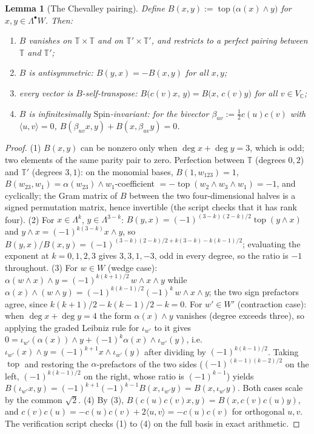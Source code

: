 \documentclass[11pt]{article}
\newtheorem{lemma}[theorem]{Lemma}
\theoremstyle{definition}
\newcommand{\C}{\mathbb{C}}
\newcommand{\T}{\mathbb{T}}
\newcommand{\ip}[2]{\langle #1, #2\rangle}
\begin{document}
\begin{lemma}[The Chevalley pairing]\label{lem:chevalley}
Define $B(x, y) := \operatorname{top}\bigl(\alpha(x) \wedge y\bigr)$ for $x, y \in \Lambda^\bullet W$. Then:
\begin{enumerate}
\item $B$ vanishes on $\T \times \T$ and on $\T' \times \T'$, and restricts to a perfect pairing between $\T$ and $\T'$;
\item $B$ is antisymmetric: $B(y,x) = -B(x,y)$ for all $x, y$;
\item every vector is $B$-self-transpose: $B\bigl(c(v)x,\, y\bigr) = B\bigl(x,\, c(v)y\bigr)$ for all $v \in V_\C$;
\item $B$ is infinitesimally $\mathrm{Spin}$-invariant: for the bivector $\beta_{uv} := \tfrac12 c(u)c(v)$ with $\ip{u}{v} = 0$, $B(\beta_{uv}x, y) + B(x, \beta_{uv}y) = 0$.
\end{enumerate}
\end{lemma}

\begin{proof}
(1) $B(x,y)$ can be nonzero only when $\deg x + \deg y = 3$, which is odd; two elements of the same parity pair to zero. Perfection between $\T$ (degrees $0,2$) and $\T'$ (degrees $3,1$): on the monomial bases, $B(1, w_{123}) = 1$, $B(w_{23}, w_1) = \alpha(w_{23})\wedge w_1$-coefficient $= -\operatorname{top}(w_2\wedge w_3\wedge w_1) = -1$, and cyclically; the Gram matrix of $B$ between the two four-dimensional halves is a signed permutation matrix, hence invertible (the script checks that it has rank four).
(2) For $x \in \Lambda^k$, $y \in \Lambda^{3-k}$: $B(y,x) = (-1)^{(3-k)(2-k)/2}\operatorname{top}(y \wedge x)$ and $y\wedge x = (-1)^{k(3-k)}x\wedge y$, so $B(y,x)/B(x,y) = (-1)^{(3-k)(2-k)/2 + k(3-k) - k(k-1)/2}$; evaluating the exponent at $k = 0,1,2,3$ gives $3, 3, 1, -3$, odd in every degree, so the ratio is $-1$ throughout.
(3) For $w \in W$ (wedge case): $\alpha(w \wedge x)\wedge y = (-1)^{k(k+1)/2}\,w\wedge x\wedge y$ while $\alpha(x)\wedge(w\wedge y) = (-1)^{k(k-1)/2}(-1)^k\,w\wedge x\wedge y$; the two sign prefactors agree, since $k(k+1)/2 - k(k-1)/2 - k = 0$. For $w' \in W'$ (contraction case): when $\deg x + \deg y = 4$ the form $\alpha(x)\wedge y$ vanishes (degree exceeds three), so applying the graded Leibniz rule for $\iota_{w'}$ to it gives $0 = \iota_{w'}(\alpha(x))\wedge y + (-1)^k \alpha(x)\wedge \iota_{w'}(y)$, i.e.\ $\iota_{w'}(x)\wedge y = (-1)^{k+1} x \wedge \iota_{w'}(y)$ after dividing by $(-1)^{k(k-1)/2}$. Taking $\operatorname{top}$ and restoring the $\alpha$-prefactors of the two sides ($(-1)^{(k-1)(k-2)/2}$ on the left, $(-1)^{k(k-1)/2}$ on the right, whose ratio is $(-1)^{k-1}$) yields $B(\iota_{w'}x, y) = (-1)^{k+1}(-1)^{k-1} B(x, \iota_{w'}y) = B(x, \iota_{w'}y)$. Both cases scale by the common $\sqrt2$.
(4) By (3), $B(c(u)c(v)x, y) = B(x, c(v)c(u)y)$, and $c(v)c(u) = -c(u)c(v) + 2\ip{u}{v} = -c(u)c(v)$ for orthogonal $u, v$. The verification script checks (1) to (4) on the full basis in exact arithmetic.
\end{proof}
\end{document}
